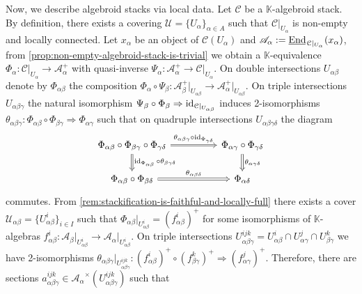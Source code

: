 Now, we describe algebroid stacks via local data. Let $\mathcal{C}$ be a $\mathbb{K}$-algebroid stack. By definition, there exists a covering $\mathscr{U} = \{U_{\alpha}\}_{\alpha\in A}$ such that $\mathcal{C}\lvert_{U_{\alpha}}$ is non-empty and locally connected. Let $x_{\alpha}$ be an object of $\mathcal{C}(U_{\alpha})$ and $\mathscr{A}_{\alpha} := \uEnd_{\mathcal{C}\lvert_{U_{\alpha}}}(x_{\alpha})$, from \cref{prop:non-empty-algebroid-stack-is-trivial} we obtain a $\mathbb{K}$-equivalence $\Phi_{\alpha}\colon \mathcal{C}\lvert_{U_{\alpha}} \to \mathscr{A}_{\alpha}^{+}$ with quasi-inverse $\Psi_{\alpha}\colon \mathscr{A}_{\alpha}^{+} \to \mathcal{C}\lvert_{U_{\alpha}}$. On double intersections $U_{\alpha\beta}$ denote by $\Phi_{\alpha\beta}$ the composition $\Phi_{\alpha}\circ\Psi_{\beta}\colon \mathscr{A}_{\beta}^{+}\lvert_{U_{\alpha\beta}} \to \mathscr{A}_{\alpha}^{+}\lvert_{U_{\alpha \beta}}$. On triple intersections $U_{\alpha\beta\gamma}$ the natural isomorphism $\Psi_{\beta}\circ\Phi_{\beta} \Rightarrow \operatorname{id}_{\mathcal{C}\lvert_{U_{\alpha\beta}}}$ induces 2-isomorphisms $\theta_{\alpha\beta\gamma}\colon \Phi_{\alpha\beta} \circ \Phi_{\beta\gamma} \Rightarrow \Phi_{\alpha\gamma}$ such that on quadruple intersections $U_{\alpha\beta\gamma\delta}$ the diagram
\begin{equation}\label{eqn:local-compatibility-algebroid}
	\begin{tikzcd}
\Phi_{\alpha\beta}\circ\Phi_{\beta\gamma} \circ \Phi_{\gamma\delta} \arrow[rr, "\theta_{\alpha\beta\gamma} \circ \id{\Phi_{\gamma\delta}}", Rightarrow] \arrow[d, "\id{\Phi_{\alpha\beta}} \circ \theta_{\beta\gamma\delta}", Rightarrow] &  & \Phi_{\alpha\gamma}\circ \Phi_{\gamma\delta} \arrow[d, "\theta_{\alpha\gamma\delta}", Rightarrow] \\
\Phi_{\alpha\beta}\circ \Phi_{\beta\delta} \arrow[rr, "\theta_{\alpha\beta\delta}", Rightarrow]                                                                              &  & \Phi_{\alpha\delta}                                                                              
\end{tikzcd}
\end{equation}
commutes. From \cref{rem:stackification-is-faithful-and-locally-full} there exists a cover $\mathscr{U}_{\alpha\beta} = \{U_{\alpha\beta}^{i}\}_{i\in I}$ such that $\Phi_{\alpha\beta}\lvert_{U_{\alpha\beta}^{i}} = (f_{\alpha\beta}^{i})^{+}$ for some isomorphisms of $\mathbb{K}$-algebras $f_{\alpha\beta}^{i}\colon \mathscr{A}_{\beta}\lvert_{U_{\alpha\beta}^{i}} \to \mathscr{A}_{\alpha}\lvert_{U_{\alpha\beta}^{i}}$. On triple intersections $U_{\alpha\beta\gamma}^{ijk} = U_{\alpha\beta}^{i}\cap U_{\alpha\gamma}^{j}\cap U_{\beta\gamma}^{k}$ we have 2-isomorphisms $\theta_{\alpha\beta\gamma}\lvert_{U_{\alpha\beta\gamma}^{ijk}}\colon (f_{\alpha\beta}^{i})^{+}\circ (f_{\beta\gamma}^{k})^{+} \Rightarrow (f_{\alpha\gamma}^{j})^{+}$. Therefore, there are sections $a_{\alpha\beta\gamma}^{ijk}\in \mathscr{A_{\alpha}}^{\times}(U_{\alpha\beta\gamma}^{ijk})$ such that 
